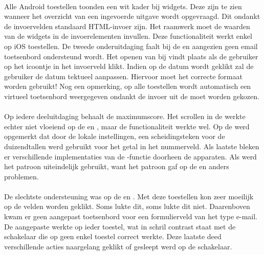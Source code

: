 \paragraph{\kendo} 
Alle Android toestellen toonden een wit kader bij  widgets.
Deze zijn te zien wanneer het overzicht van een ingevoerde uitgave wordt opgevraagd.
Dit ondankt de invoervelden standaard HTML-invoer zijn.
Het raamwerk moet de waarden van de widgets in de  invoerelementen invullen.
Deze functionaliteit werkt enkel op iOS toestellen.
De tweede onderuitdaging faalt bij de \htc{} en \gtab{} aangezien geen email toetsenbord ondersteund wordt.
Het openen van  bij \kendo{} vindt plaats als de gebruiker op het icoontje in het invoerveld klikt.
Indien op de datum wordt geklikt zal de gebruiker de datum tektueel aanpassen.  
Hiervoor moet het correcte formaat worden gebruikt!
Nog een opmerking,  op alle toestellen wordt automatisch een virtueel toetsenbord weergegeven ondankt de invoer uit de  moet worden gekozen.

\paragraph{\jqm} 
Op iedere deeluitdaging behaalt \jqm{} de maximumscore.
Het scrollen in de  werkte echter niet vloeiend op de \htc{} en \gtab{}, maar de functionaliteit werkte wel.
Op de \ipadi{} werd opgemerkt dat door de lokale instellingen, een scheidingsteken voor de duizendtallen werd gebruikt voor het getal in het nummerveld.
Als laatste bleken er verschillende implementaties van de \js{}-functie  doorheen de apparaten.
Als  werd het patroon  uiteindelijk gebruikt, want het patroon  gaf op de \htc{} en \gtab{} anders problemen.

\paragraph{\lungo} 
De slechtste ondersteuning was op de \htc{} en \gtab{}.
Met deze toestellen kon zeer moeilijk op de velden worden geklikt.
Soms lukte dit, soms lukte dit niet.
Daarenboven kwam er geen aangepast toetsenbord voor een formulierveld van het type e-mail.
De aangepaste  werkte op ieder toestel, wat in schril contrast staat met de schakelaar die op geen enkel toestel correct werkte.
Deze laatste deed verschillende acties naargelang geklikt of gesleept werd op de schakelaar.

